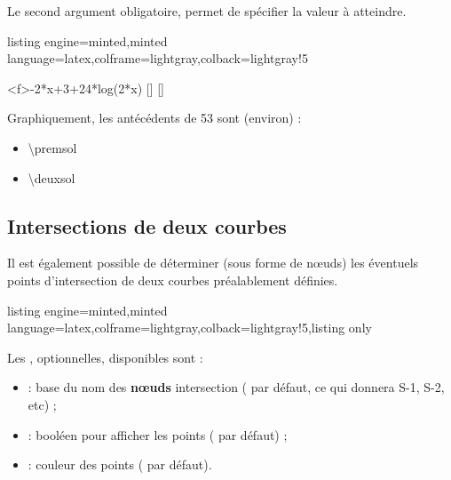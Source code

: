 \documentclass[11pt,a4paper]{ltxdoc}
\begin{document}
\smallskip

Le second argument obligatoire, permet de spécifier la valeur à atteindre.

\begin{tcblisting}{listing engine=minted,minted language=latex,colframe=lightgray,colback=lightgray!5}
\begin{GraphiqueTikz}%
	[x=0.9cm,y=0.425cm,Xmin=4,Xmax=20,Origx=4,
	Ymin=40,Ymax=56,Ygrille=2,Ygrilles=1,Origy=40]
	{-2*x+3+24*log(2*x)}
	[\premsol]
	[\deuxsol]
\end{GraphiqueTikz}

Graphiquement, les antécédents de 53 sont (environ) :

\begin{itemize}
	\item \num{\premsol}
	\item \num{\deuxsol}
\end{itemize}
\end{tcblisting}

\pagebreak

\subsection{Intersections de deux courbes}\label{intersect}

Il est également possible de déterminer (sous forme de nœuds) les éventuels points d'intersection de deux courbes préalablement définies.

\begin{tcblisting}{listing engine=minted,minted language=latex,colframe=lightgray,colback=lightgray!5,listing only}
\end{tcblisting}

Les \MontreCode{[clés]}, optionnelles, disponibles sont :

\smallskip

\begin{itemize}
	\item {} : base du nom des \textbf{nœuds} intersection ( par défaut, ce qui donnera \textsf{S-1}, \textsf{S-2}, etc) ;
	\item {} : booléen pour afficher les points ( par défaut) ;
	\item {} : couleur des points ( par défaut).
\end{itemize}
\end{document}
